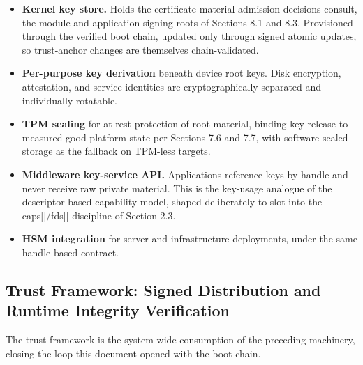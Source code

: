 \documentclass[11pt, a4paper]{article}
\begin{document}
\begin{itemize}
\item \textbf{Kernel key store.} Holds the certificate material admission decisions consult, the module and application signing roots of Sections 8.1 and 8.3. Provisioned through the verified boot chain, updated only through signed atomic updates, so trust-anchor changes are themselves chain-validated.
\item \textbf{Per-purpose key derivation} beneath device root keys. Disk encryption, attestation, and service identities are cryptographically separated and individually rotatable.
\item \textbf{TPM sealing} for at-rest protection of root material, binding key release to measured-good platform state per Sections 7.6 and 7.7, with software-sealed storage as the fallback on TPM-less targets.
\item \textbf{Middleware key-service API.} Applications reference keys by handle and never receive raw private material. This is the key-usage analogue of the descriptor-based capability model, shaped deliberately to slot into the caps[]/fds[] discipline of Section 2.3.
\item \textbf{HSM integration} for server and infrastructure deployments, under the same handle-based contract.
\end{itemize}

\subsection{Trust Framework: Signed Distribution and Runtime Integrity Verification}\label{trust-framework}

The trust framework is the system-wide consumption of the preceding machinery, closing the loop this document opened with the boot chain.
\end{document}
